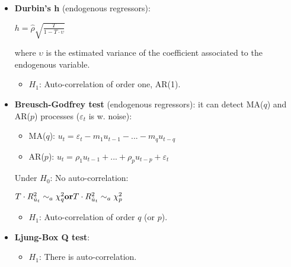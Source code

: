 \documentclass[10pt, a4paper, landscape]{extarticle}
\begin{document}
\begin{multicols}{3}
\begin{itemize}[leftmargin=*]
\begin{itemize}[leftmargin=*]
\begin{center}
				\end{center}
				\item \textbf{Durbin's h} (endogenous regressors):
				\begin{center}
					$h = \hat{\rho} \sqrt{\frac{T}{1 - T \cdot \upsilon}}$
				\end{center}
				where $\upsilon$ is the estimated variance of the coefficient associated to the endogenous variable.
				\begin{itemize}[leftmargin=*]
					\item $H_1$: Auto-correlation of order one, AR(1).
				\end{itemize}
				\item \textbf{Breusch-Godfrey test} (endogenous regressors): it can detect MA($q$) and AR($p$) processes ($\varepsilon_t$ is w. noise):
				\begin{itemize}[leftmargin=*]
					\item MA($q$): $u_t = \varepsilon_t - m_1 u_{t-1} - ... - m_q u_{t-q}$
					\item AR($p$): $u_t = \rho_1 u_{t-1} + ... + \rho_p u_{t-p} + \varepsilon_t$
				\end{itemize}
				Under $H_0$: No auto-correlation:
				\begin{center}
					$\hfill T \cdot R^2_{\hat{u}_t} \sim_a \chi^2_q \hfill \textbf{or} \hfill T \cdot R^2_{\hat{u}_t} \sim_a \chi^2_p \hfill$
				\end{center}
				\begin{itemize}[leftmargin=*]
					\item $H_1$: Auto-correlation of order $q$ (or $p$).
				\end{itemize}
				\item \textbf{Ljung-Box Q test}:
				\begin{itemize}[leftmargin=*]
					\item $H_1$: There is auto-correlation.
				\end{itemize}
			\end{itemize}
		\end{itemize}

\end{multicols}
\end{document}
